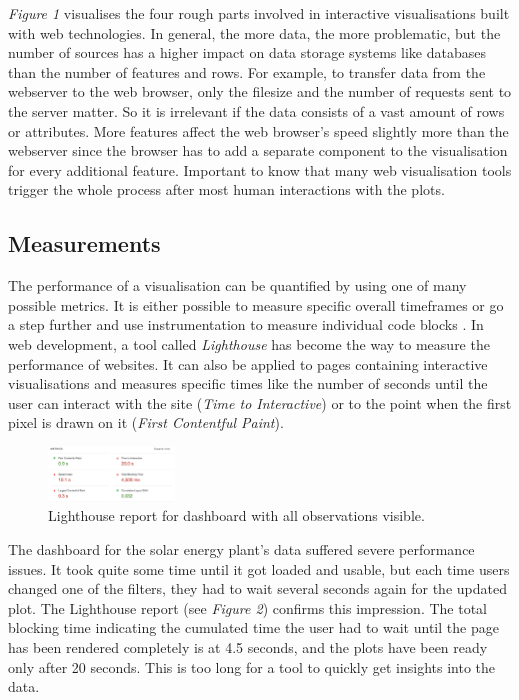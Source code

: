 \documentclass[11pt]{article}
\begin{document}
\textit{Figure 1} visualises the four rough parts involved in interactive visualisations built with web technologies. In general, the more data, the more problematic, but the number of sources has a higher impact on data storage systems like databases than the number of features and rows. For example, to transfer data from the webserver to the web browser, only the filesize and the number of requests sent to the server matter. So it is irrelevant if the data consists of a vast amount of rows or attributes. More features affect the web browser's speed slightly more than the webserver since the browser has to add a separate component to the visualisation for every additional feature. Important to know that many web visualisation tools trigger the whole process after most human interactions with the plots.

\subsection{Measurements}

The performance of a visualisation can be quantified by using one of many possible metrics. It is either possible to measure specific overall timeframes or go a step further and use instrumentation to measure individual code blocks \parencite{isaacs_state_2014}. In web development, a tool called \textit{Lighthouse} \parencite{google_lighthouse_2021} has become the way to measure the performance of websites. It can also be applied to pages containing interactive visualisations and measures specific times like the number of seconds until the user can interact with the site (\textit{Time to Interactive}) or to the point when the first pixel is drawn on it (\textit{First Contentful Paint}).

\begin{figure}
    \includegraphics[width=0.3\textwidth]{./lighthouse-1.png}
    \caption{Lighthouse report for dashboard with all observations visible.}
\end{figure}

The dashboard for the solar energy plant's data suffered severe performance issues. It took quite some time until it got loaded and usable, but each time users changed one of the filters, they had to wait several seconds again for the updated plot. The Lighthouse report (see \textit{Figure 2}) confirms this impression. The total blocking time indicating the cumulated time the user had to wait until the page has been rendered completely is at 4.5 seconds, and the plots have been ready only after 20 seconds. This is too long for a tool to quickly get insights into the data.
\end{document}

